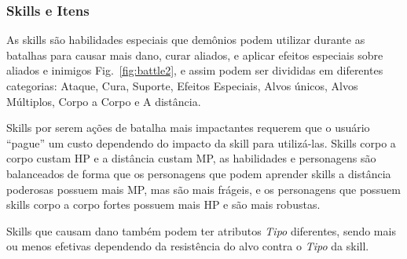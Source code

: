\subsubsection{Skills e Itens}

As skills são habilidades especiais que demônios podem utilizar durante as batalhas para causar mais dano, curar aliados, e aplicar efeitos especiais sobre aliados e inimigos Fig.~\ref{fig:battle2}, e assim podem ser divididas em diferentes categorias: Ataque, Cura, Suporte, Efeitos Especiais, Alvos únicos, Alvos Múltiplos, Corpo a Corpo e A distância.

Skills por serem ações de batalha mais impactantes requerem que o usuário “pague” um custo dependendo do impacto da skill para utilizá-las. Skills corpo a corpo custam HP e a distância custam MP, as habilidades e personagens são balanceados de forma que os personagens que podem aprender skills a distância poderosas possuem mais MP, mas são mais frágeis, e os personagens que possuem skills corpo a corpo fortes possuem mais HP e são mais robustas.

Skills que causam dano também podem ter atributos \emph{Tipo} diferentes, sendo mais ou menos efetivas dependendo da resistência do alvo contra o \emph{Tipo} da skill.


